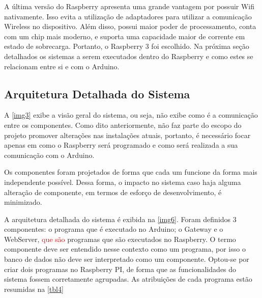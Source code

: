 			A última versão do Raspberry apresenta uma grande vantagem por possuir Wifi nativamente. Isso evita a utilização de adaptadores para utilizar a comunicação Wireless no dispositivo. Além disso, possui maior poder de processamento, conta com um chip mais moderno, e suporta uma capacidade maior de corrente em estado de sobrecarga. Portanto, o Raspberry 3 foi escolhido. Na próxima seção detalhados os sistemas a serem executados dentro do Raspberry e como estes se relacionam entre si e com o Arduino.
			
		\subsection{Arquitetura Detalhada do Sistema}
			A \autoref{img3} exibe a visão geral do sistema, ou seja, não exibe como é a comunicação entre os componentes. Como dito anteriormente, não faz parte do escopo do projeto promover alterações nas instalações atuais, portanto, é necessário focar apenas em como o Raspberry será programado e como será realizada a sua comunicação com o Arduino.
			
			Os componentes foram projetados de forma que cada um funcione da forma mais independente possível. Dessa forma, o impacto no sistema caso haja alguma alteração de componente, em termos de esforço de desenvolvimento, é minimizado.
			
			A arquitetura detalhada do sistema é exibida na \autoref{img6}. Foram definidos 3 componentes: o programa que é executado no Arduino; o Gateway e o WebServer, \textcolor{red}{que são} programas que são executados no Raspberry. O termo componente deve ser entendido nesse contexto como um programa, por isso o banco de dados não deve ser interpretado como um componente. Optou-se por criar dois programas no Raspberry PI, de forma que as funcionalidades do sistema fossem corretamente agrupadas. As atribuições de cada programa estão resumidas na \autoref{tbl4}
			
